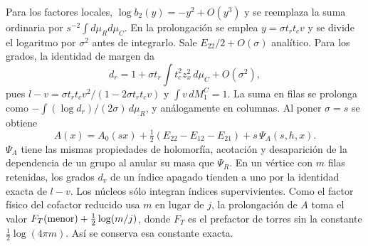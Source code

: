 Para los factores locales, $\log b_2(y)=-y^2+O(y^3)$ y se reemplaza la suma ordinaria
por $s^{-2}\int d\mu_R d\mu_C$. En la prolongación se emplea
$y=\sigma t_rt_c v$ y se divide el logaritmo por $\sigma^2$ antes de integrarlo.
Sale $E_{22}/2+O(\sigma)$ analítico. Para los grados, la identidad de margen da
\[
 d_r=1+\sigma t_r\int t_c^2 z_x^2\,d\mu_C+O(\sigma^2),
\]
pues $l-v=\sigma t_rt_c v^2/(1-2\sigma t_rt_c v)$ y $\int v\,dM_1^C=1$.
La suma en filas se prolonga como $-\int(\log d_r)/(2\sigma)\,d\mu_R$,
y análogamente en columnas. Al poner $\sigma=s$ se obtiene
\[
 A(x)=A_0(sx)+\tfrac12(E_{22}-E_{12}-E_{21})+s\,\Psi_A(s,h,x).
\]
$\Psi_A$ tiene las mismas propiedades de holomorfía, acotación y desaparición de la
dependencia de un grupo al anular su masa que $\Psi_R$.
En un vértice con $m$ filas retenidas, los grados $d_v$ de un índice apagado tienden a uno
por la identidad exacta de $l-v$. Los núcleos sólo integran índices supervivientes.
Como el factor físico del cofactor reducido usa $m$ en lugar de $j$, la prolongación de
$A$ toma el valor $F_T({\rm menor})+\tfrac12\log(m/j)$, donde $F_T$ es el prefactor
de torres sin la constante $\tfrac12\log(4\pi m)$. Así se conserva esa constante exacta.

